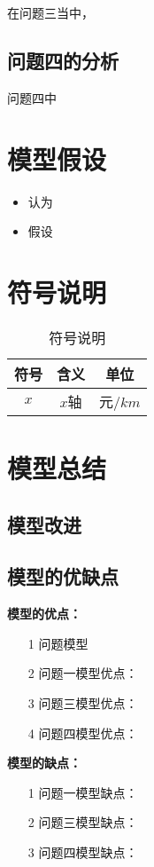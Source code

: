 \documentclass{cumcmthesis}
\begin{document}
在问题三当中，
\subsection{问题四的分析}
问题四中

\newpage
\section{模型假设}
\begin{itemize}
	\item 认为
	\item 假设
\end{itemize}

\newpage
\section{符号说明}
\begin{table}[H]
	\caption{符号说明}
	\centering
	\begin{tabular}{ccc}
		\toprule[1.5pt]
		符号 & 含义  & 单位    \\
		\midrule[1pt]
		$x$  & $x$轴 & 元/$km$ \\
		\bottomrule[1.5pt]
	\end{tabular}
\end{table}


\newpage
\section{模型总结}
\subsection{模型改进}

\subsection{模型的优缺点}

\textbf{模型的优点：}
\begin{itemize}
	\item[1] 问题模型
	\item[2] 问题一模型优点：
	\item[3] 问题三模型优点：
	\item[4] 问题四模型优点：
\end{itemize}

\textbf{模型的缺点：}
\begin{itemize}
	\item[1] 问题一模型缺点：
	\item[2] 问题三模型缺点：
	\item[3] 问题四模型缺点：
\end{itemize}
\newpage

\end{document}
